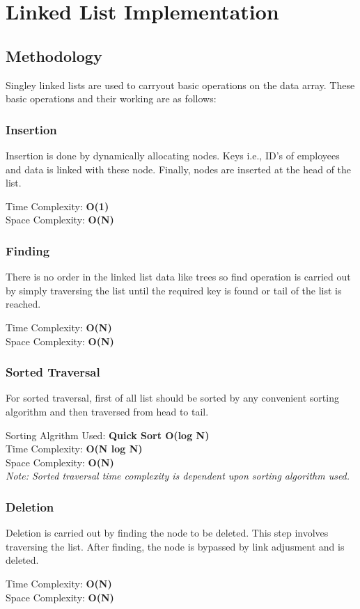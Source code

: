 \chapter{Linked List Implementation} %
\label{Chapter5}
\section{Methodology}
Singley linked lists are used to carryout basic operations on the data array. These basic operations and their working are as follows:

\subsection{Insertion}
Insertion is done by dynamically allocating nodes. Keys i.e., ID's of employees and data is linked with these node. Finally, nodes are inserted at the head of the list.

Time Complexity: \textbf{O(1)} \\
Space Complexity: \textbf{O(N)}

\subsection{Finding}
There is no order in the linked list data like trees so find operation is carried out by simply traversing the list until the required key is found or tail of the list is reached.

Time Complexity: \textbf{O(N)} \\
Space Complexity: \textbf{O(N)}

\subsection{Sorted Traversal}
For sorted traversal, first of all list should be sorted by any convenient sorting algorithm and then traversed from head to tail.

Sorting Algrithm Used: \textbf{Quick Sort O(log N)} \\
Time Complexity: \textbf{O(N log N)}\\ 
Space Complexity: \textbf{O(N)} \\
\textit{Note: Sorted traversal time complexity is dependent upon sorting algorithm used.}\\
\subsection{Deletion}
Deletion is carried out by finding the node to be deleted. This step involves traversing the list. After finding, the node is bypassed by link adjusment and is deleted. 

Time Complexity: \textbf{O(N)} \\
Space Complexity: \textbf{O(N)}